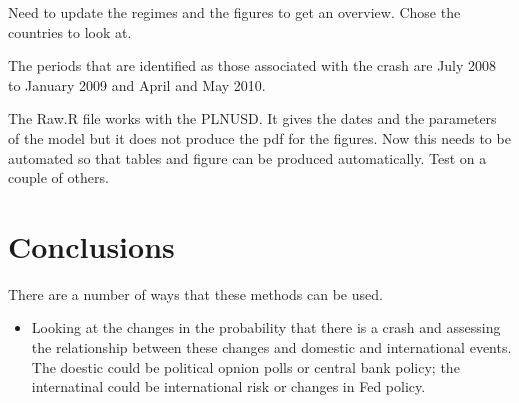 \documentclass[12pt, a4paper, oneside]{article} %
\begin{document}
Need to update the regimes and the figures to get an overview.  Chose the countries to look at. 

The periods that are identified as those associated with the crash are July 2008 to January 2009 and April and May 2010.  

The Raw.R file works with the PLNUSD.  It gives the dates and the parameters of the model but it does not produce the pdf for the figures. Now this needs to be automated so that tables and figure can be produced automatically. Test on a couple of others. 

\section{Conclusions}
There are a number of ways that these methods can be used. 
\begin{itemize}
\item Looking at the changes in the probability that there is a crash and assessing the relationship between these changes and domestic and international events.  The doestic could be political opnion polls or central bank policy; the internatinal could be international risk or changes in Fed policy.  
\end{itemize}


\end{document}

